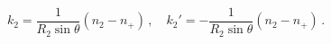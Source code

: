 \begin{equation}
k_2=\frac{1}{R_2 \sin\theta}(n_2-n_+)\,, \quad
k_2'=-\frac{1}{R_2 \sin\theta}(n_2-n_+)\,.
\label{k22}
\end{equation}

